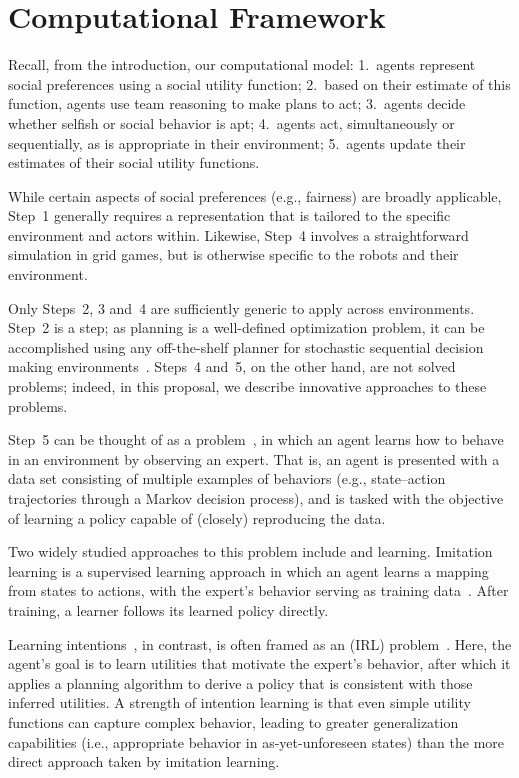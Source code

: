
\section{Computational Framework}
\label{sec:process}

Recall, from the introduction, our computational model:
1.~agents represent social preferences using a social utility function;
2.~based on their estimate of this function, agents use team reasoning to make plans to act;
3.~agents decide whether selfish or social behavior is apt;
4.~agents act, simultaneously or sequentially, as is appropriate in their environment;
5.~agents update their estimates of their social utility functions.

While certain aspects of social preferences (e.g., fairness) are broadly applicable,
Step~1 generally requires a representation that is tailored to the specific environment and actors within.
Likewise, Step~4 involves a straightforward simulation in grid games, but is
otherwise specific to the robots and their environment.

Only Steps~2, 3 and~4 are sufficiently generic to apply across
environments.  Step~2 is a  step; as planning is
a well-defined optimization problem,
it can be accomplished using any off-the-shelf planner for
stochastic sequential decision making
environments~\cite{Barto95,bellman57,boutilier99,collins95,kearns99b,kocsis06}.
%
Steps~4 and~5, on the other hand, are not solved problems; indeed, in this
proposal,
we describe innovative approaches to these problems.

Step~5 can be thought of as a 
problem~\cite{argall09}, in which an agent learns how to behave in an
environment by observing an expert.  That is, an agent is presented
with a data set consisting of multiple examples of behaviors (e.g.,
state--action trajectories through a Markov decision process), and is
tasked with the objective of learning a policy capable of (closely)
reproducing the data.

Two widely studied approaches to this problem include
 and  learning.  Imitation learning
is a supervised learning approach in which an agent learns a mapping
from states to actions, with the expert's behavior serving as training
data~\cite{pomerleau93}.  After training, a learner follows its
learned policy directly.

Learning intentions~\cite{macglashan15b}, in contrast, is often framed
as an  (IRL)
problem~\cite{babes11,ng00}.  Here, the agent's goal is to learn
utilities that motivate the expert's behavior, after which it applies a
planning algorithm to derive a policy that is consistent with those
inferred utilities.  A strength of intention learning is that even simple
utility functions can capture complex behavior, leading to greater
generalization capabilities (i.e., appropriate behavior in
as-yet-unforeseen states) than the more direct approach taken by
imitation learning.

